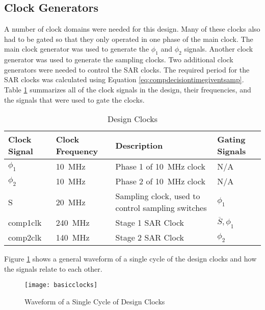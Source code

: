 \subsection{Clock Generators}
A number of clock domains were needed for this design. Many of these clocks also had to be gated so that they only operated in one phase of the main clock. The main clock generator was used to generate the $\phi_{1}$ and $\phi_{2}$ signals. Another clock generator was used to generate the sampling clocks. Two additional clock generators were needed to control the SAR clocks. The required period for the SAR clocks was calculated using Equation \ref{eq:compdecisiontimegiventsamp}. Table \ref{tab:clockingscheme} summarizes all of the clock signals in the design, their frequencies, and the signals that were used to gate the clocks.
\begin{table}[htbp]
\begin{center}
\renewcommand*\arraystretch{1.3}
\begin{tabularx}{\linewidth}{|l|l|X|l|}
\hline
Clock Signal & Clock Frequency & Description & Gating Signals \\ \hline
$\phi_{1}$ & \SI{10}{\mega\hertz} & Phase 1 of \SI{10}{\mega\hertz} clock & N/A \\ \hline
$\phi_{2}$ & \SI{10}{\mega\hertz} & Phase 2 of \SI{10}{\mega\hertz} clock & N/A \\ \hline
S & \SI{20}{\mega\hertz} & Sampling clock, used to control sampling switches & $\phi_{1}$ \\ \hline
comp1clk & \SI{240}{\mega\hertz} & Stage 1 SAR Clock & $\overline{S}, \phi_{1}$ \\ \hline
comp2clk & \SI{140}{\mega\hertz} & Stage 2 SAR Clock & $\phi_{2}$ \\ \hline
\end{tabularx}
\end{center}
\caption{Design Clocks}
\label{tab:clockingscheme}
\end{table}
Figure \ref{fig:basicclocks} shows a general waveform of  a single cycle of the design clocks and how the signals relate to each other.
\begin{figure}[htbp]
\centering
\texttt{[image: basicclocks]}
\caption{Waveform of a Single Cycle of Design Clocks}
\label{fig:basicclocks}
\end{figure}
